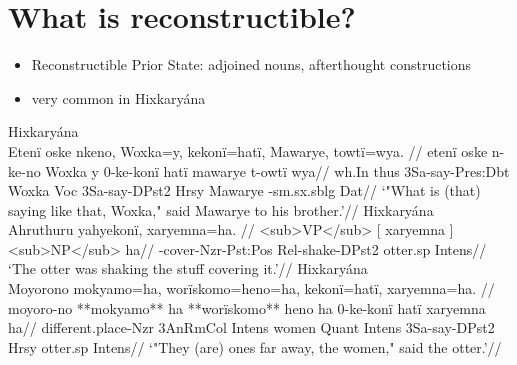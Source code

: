 \documentclass[10pt]{article}
\begin{document}
\section{What is reconstructible?}

\begin{itemize}
\tightlist
\item
  Reconstructible Prior State: adjoined nouns, afterthought
  constructions 
\item
  very common in Hixkaryána
  \parencites[101-104, 129-135]{hixkaryanaderby1985}
\end{itemize}

\pex\label{}    \a Hixkaryána\\
    \label{derbyshire-1965-p-052-the-origin-of-mawarye-and-woxka-235}        \begingl
        \glpreamble Etenï oske nkeno, Woxka=y, kekonï=hatï, Mawarye, towtï=wya. //
        \gla etenï oske n-ke-no Woxka y 0-ke-konï hatï mawarye t-owtï wya//
        \glb wh.In thus 3Sa-say-Pres:Dbt Woxka Voc 3Sa-say-DPst2 Hrsy Mawarye -sm.sx.sblg Dat//
            \glft ‘"What is (that) saying like that, Woxka," said Mawarye to his brother.’//  
        \endgl 
    \a Hixkaryána\\
    \label{derbyshire-1965-p-061-the-wives-of-mawarye-and-woxka-040}        \begingl
        \glpreamble Ahruthuru yahyekonï, xaryemna=ha. //
        <sub>VP</sub> [ xaryemna ]<sub>NP</sub> ha//
        \glb   {}-cover-Nzr-Pst:Pos Rel-shake-DPst2     otter.sp   Intens//
            \glft ‘The otter was shaking the stuff covering it.’//  
        \endgl 
    \a Hixkaryána\\
    \label{derbyshire-1965-p-062-the-wives-of-mawarye-and-woxka-071}        \begingl
        \glpreamble Moyorono mokyamo=ha, worïskomo=heno=ha, kekonï=hatï, xaryemna=ha. //
        \gla moyoro-no **mokyamo** ha **worïskomo** heno ha 0-ke-konï hatï xaryemna ha//
        \glb different.place-Nzr 3AnRmCol Intens women Quant Intens 3Sa-say-DPst2 Hrsy otter.sp Intens//
            \glft ‘"They (are) ones far away, the women," said the otter.’//  
        \endgl 
\xe
\end{document}
